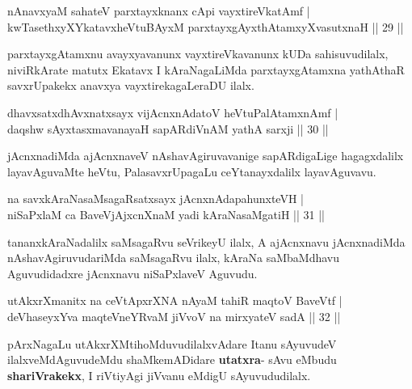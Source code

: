 \begin{shl}
nAnavxyaM sahateV parxtayxknanx cApi vayxtireVkatAmf |\\
kwTasethxyXYkatavxheVtuBAyxM parxtayxgAyxthAtamxyXvasutxnaH \hfill || 29 ||
\end{shl}

\begin{artha}
parxtayxgAtamxnu avayxyavanunx vayxtireVkavanunx kUDa sahisuvudilalx, niviRkArate matutx Ekatavx I kAraNagaLiMda parxtayxgAtamxna yathAthaR savxrUpakekx anavxya vayxtirekagaLeraDU ilalx.
\end{artha}


\begin{shl}
dhavxsatxdhAvxnatxsayx vijAcnxnAdatoV heVtuPalAtamxnAmf |\\
daqshw sAyxtasxmavanayaH sapARdiVnAM yathA sarxji \hfill || 30 ||
\end{shl}

\begin{artha}
jAcnxnadiMda ajAcnxnaveV nAshavAgiruvavanige  sapARdigaLige hagagxdalilx layavAguvaMte heVtu, PalasavxrUpagaLu ceYtanayxdalilx 
layavAguvavu.
\end{artha}

\begin{shl}
na savxkAraNasaMsagaRsatxsayx jAcnxnAdapahunxteVH |\\
niSaPxlaM ca BaveVjAjxcnXnaM yadi kAraNasaMgatiH \hfill || 31 ||
\end{shl}

\begin{artha}
tananxkAraNadalilx saMsagaRvu seVrikeyU ilalx, A  ajAcnxnavu jAcnxnadiMda 
nAshavAgiruvudariMda saMsagaRvu ilalx, kAraNa saMbaMdhavu Aguvudidadxre jAcnxnavu 
niSaPxlaveV Aguvudu.
\end{artha}

\begin{shl}
utAkxrXmanitx na ceVtApxrXNA nAyaM tahiR maqtoV BaveVtf |\\
deVhaseyxYva maqteVneYRvaM jiVvoV na mirxyateV sadA \hfill || 32 ||
\end{shl}

\begin{artha}
pArxNagaLu utAkxrXMtihoMduvudilalxvAdare Itanu sAyuvudeV ilalxveMdAguvudeMdu shaMkemADidare \textbf{utatxra}- sAvu eMbudu \textbf{shariVrakekx}, I riVtiyAgi jiVvanu eMdigU sAyuvududilalx. 
\end{artha}

